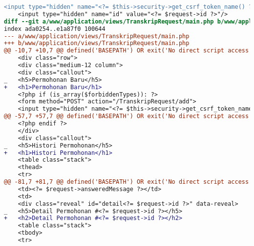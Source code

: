 \begin{itemize}
\begin{lstlisting}[frame=single, label={lst:perbaikan_1.3.1_tag_heading}, language=diff, caption=Perbaikan Kriteria Sukses 1.3.1 pada Bagian \textit{Heading}]
    <input type="hidden" name="<?= $this->security->get_csrf_token_name() ?>" value="<?= $this->security->get_csrf_hash() ?>" />
    <input type="hidden" name="id" value="<?= $request->id ?>"/>
diff --git a/www/application/views/TranskripRequest/main.php b/www/application/views/TranskripRequest/main.php
index ada0254..e1a87f0 100644
--- a/www/application/views/TranskripRequest/main.php
+++ b/www/application/views/TranskripRequest/main.php
@@ -10,7 +10,7 @@ defined('BASEPATH') OR exit('No direct script access allowed');
    <div class="row">
    <div class="medium-12 column">
    <div class="callout">
_   <h5>Permohonan Baru</h5>
+   <h1>Permohonan Baru</h1>
    <?php if (is_array($forbiddenTypes)): ?>
    <form method="POST" action="/TranskripRequest/add">
    <input type="hidden" name="<?= $this->security->get_csrf_token_name() ?>" value="<?= $this->security->get_csrf_hash() ?>" />
@@ -57,7 +57,7 @@ defined('BASEPATH') OR exit('No direct script access allowed');
    <?php endif ?>
    </div>
    <div class="callout">
_   <h5>Histori Permohonan</h5>
+   <h1>Histori Permohonan</h1>
    <table class="stack">
    <thead>
    <tr>
@@ -81,7 +81,7 @@ defined('BASEPATH') OR exit('No direct script access allowed');
    <td><?= $request->answeredMessage ?></td>
    <td>
    <div class="reveal" id="detail<?= $request->id ?>" data-reveal>
_   <h5>Detail Permohonan #<?= $request->id ?></h5>
+   <h2>Detail Permohonan #<?= $request->id ?></h2>
    <table class="stack">
    <tbody>
    <tr>
\end{lstlisting}


\end{itemize}
